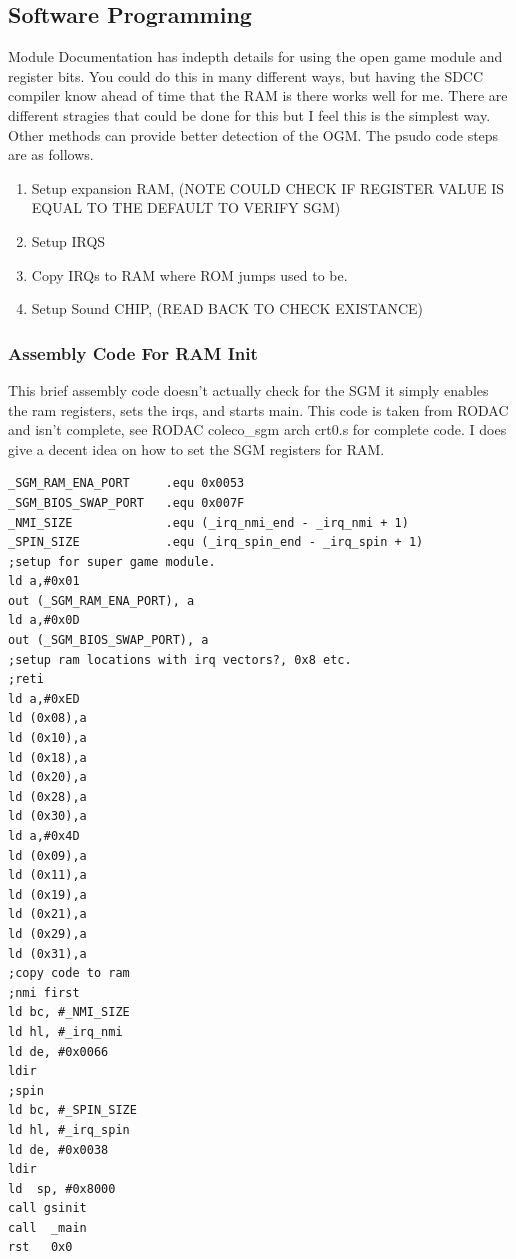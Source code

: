 \subsection{Software Programming}
\par
Module Documentation has in\-depth details for using the open game module and register bits. You could do this in many different ways, but
having the SDCC compiler know ahead of time that the RAM is there works well for me. There are different stragies that could be done for this
but I feel this is the simplest way. Other methods can provide better detection of the OGM. The psudo code steps are as follows.

\begin{enumerate}
  \item Setup expansion RAM, (NOTE COULD CHECK IF REGISTER VALUE IS EQUAL TO THE DEFAULT TO VERIFY SGM)
  \item Setup IRQS
  \item Copy IRQs to RAM where ROM jumps used to be.
  \item Setup Sound CHIP, (READ BACK TO CHECK EXISTANCE)
\end{enumerate}

\subsubsection{Assembly Code For RAM Init}

\par
This brief assembly code doesn't actually check for the SGM it simply enables the ram registers, sets the irqs, and starts main. This code is taken
from RODAC and isn't complete, see RODAC coleco\_sgm arch crt0.s for complete code. I does give a decent idea on how to set the SGM registers for RAM.

\begin{lstlisting}[language={[x86masm]Assembler}]
_SGM_RAM_ENA_PORT     .equ 0x0053
_SGM_BIOS_SWAP_PORT   .equ 0x007F
_NMI_SIZE             .equ (_irq_nmi_end - _irq_nmi + 1)
_SPIN_SIZE            .equ (_irq_spin_end - _irq_spin + 1)
;setup for super game module.
ld a,#0x01
out (_SGM_RAM_ENA_PORT), a
ld a,#0x0D
out (_SGM_BIOS_SWAP_PORT), a
;setup ram locations with irq vectors?, 0x8 etc.
;reti
ld a,#0xED
ld (0x08),a
ld (0x10),a
ld (0x18),a
ld (0x20),a
ld (0x28),a
ld (0x30),a
ld a,#0x4D
ld (0x09),a
ld (0x11),a
ld (0x19),a
ld (0x21),a
ld (0x29),a
ld (0x31),a
;copy code to ram
;nmi first
ld bc, #_NMI_SIZE
ld hl, #_irq_nmi
ld de, #0x0066
ldir
;spin
ld bc, #_SPIN_SIZE
ld hl, #_irq_spin
ld de, #0x0038
ldir
ld	sp, #0x8000
call gsinit
call  _main
rst   0x0
\end{lstlisting}

